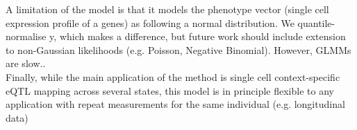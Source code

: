 A limitation of the model is that it models the phenotype vector (single cell expression profile of a genes) as following a normal distribution.
We quantile-normalise y, which makes a difference, but future work should include extension to non-Gaussian likelihoods (e.g. Poisson, Negative Binomial).
However, GLMMs are slow..\\

Finally, while the main application of the method is single cell context-specific eQTL mapping across several states, this model is in principle flexible to any application with repeat measurements for the same individual (e.g. longitudinal data)
